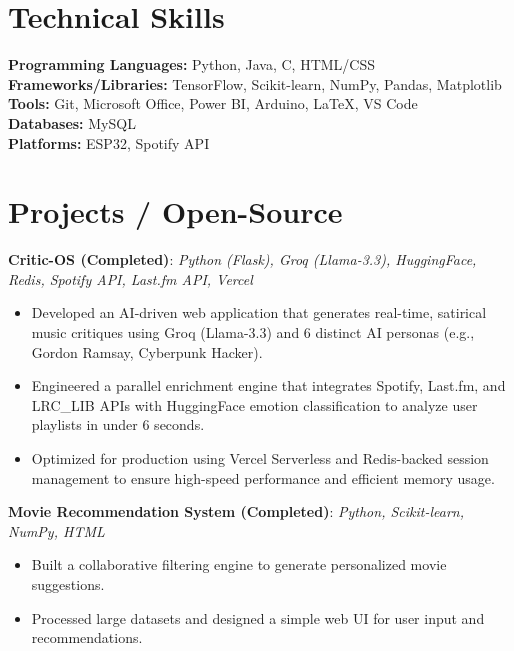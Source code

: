 \documentclass[a4paper,10pt]{article}
\begin{document}
\section*{Technical Skills}
\textbf{Programming Languages:} Python, Java, C, HTML/CSS \\
\textbf{Frameworks/Libraries:} TensorFlow, Scikit-learn, NumPy, Pandas, Matplotlib \\
\textbf{Tools:} Git, Microsoft Office, Power BI, Arduino, \LaTeX, VS Code \\
\textbf{Databases:} MySQL \\
\textbf{Platforms:} ESP32, Spotify API

\section*{Projects / Open-Source}

\textbf{Critic-OS (Completed)}:
\textit{Python (Flask), Groq (Llama-3.3), HuggingFace, Redis, Spotify API, Last.fm API, Vercel}
\begin{itemize}
    \item Developed an AI-driven web application that generates real-time, satirical music critiques using Groq (Llama-3.3) and 6 distinct AI personas (e.g., Gordon Ramsay, Cyberpunk Hacker).
    \item Engineered a parallel enrichment engine that integrates Spotify, Last.fm, and LRC\_LIB APIs with HuggingFace emotion classification to analyze user playlists in under 6 seconds.
    \item Optimized for production using Vercel Serverless and Redis-backed session management to ensure high-speed performance and efficient memory usage.
\end{itemize}

\vspace{8pt}
\textbf{Movie Recommendation System (Completed)}:
\textit{Python, Scikit-learn, NumPy, HTML}  
\begin{itemize}
    \item Built a collaborative filtering engine to generate personalized movie suggestions.
    \item Processed large datasets and designed a simple web UI for user input and recommendations.
\end{itemize}
\end{document}
